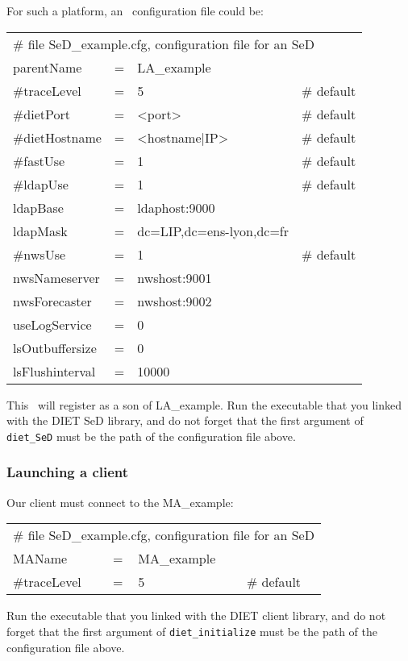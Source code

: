 For such a platform, an \sed\ configuration file could be:
\tt
\begin{center}
 \footnotesize
 \begin{tabular}{lcll}
  \multicolumn{4}{l}{\# file SeD\_example.cfg, configuration file for an SeD}\\
  parentName   &=&LA\_example        &\\
  \#traceLevel &=&5                 &\# default\\
  \#dietPort    &=&<port>             &\# default\\
  \#dietHostname&=&<hostname|IP>      &\# default\\
  \#fastUse    &=&1                 &\# default\\
  \#ldapUse    &=&1                 &\# default\\
  ldapBase     &=&ldaphost:9000     &\\
  ldapMask     &=&dc=LIP,dc=ens-lyon,dc=fr&\\
  \#nwsUse     &=&1                 &\# default\\
  nwsNameserver&=&nwshost:9001      &\\
  nwsForecaster&=&nwshost:9002      &\\
  useLogService &=& 0                 &\\
  lsOutbuffersize &=& 0               &\\
  lsFlushinterval &=& 10000           &\\
 \end{tabular}
\end{center}
\rm

This \sed\ will register as a son of LA\_example. Run the executable that you
linked with the DIET SeD library, and do not forget that the first argument of
\texttt{diet\_SeD} must be the path of the configuration file above.


\subsubsection{Launching a client}

Our client must connect to the MA\_example:
\tt
\begin{center}
 \footnotesize
 \begin{tabular}{lcll}
  \multicolumn{4}{l}{\# file SeD\_example.cfg, configuration file for an SeD}\\
  MAName       &=&MA\_example        &\\
  \#traceLevel &=&5                 &\# default\\
 \end{tabular}
\end{center}
\rm

Run the executable that you linked with the DIET client library, and do not
forget that the first argument of \texttt{diet\_initialize} must be the path of
the configuration file above.

